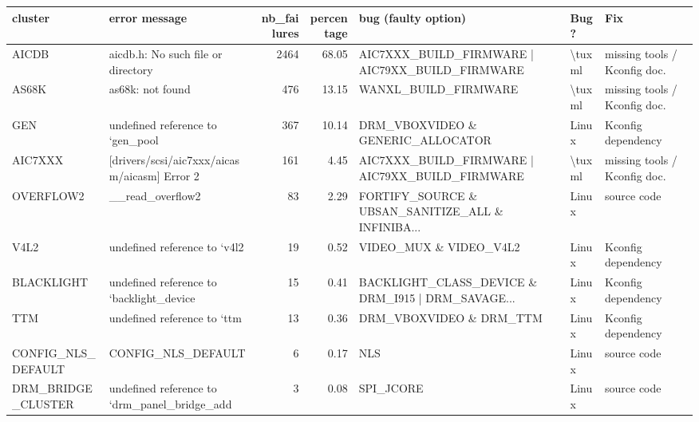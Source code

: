 \begin{tabular}{llrrlll}
\toprule
            cluster &                                      error message &  nb\_failures &  percentage &                                bug (faulty option) &    Bug? &                           Fix \\
\midrule
              AICDB &                 aicdb.h: No such file or directory &         2464 &       68.05 &    AIC7XXX\_BUILD\_FIRMWARE | AIC79XX\_BUILD\_FIRMWARE &  \textbackslash tuxml &  missing tools / Kconfig doc. \\
              AS68K &                                   as68k: not found &          476 &       13.15 &                               WANXL\_BUILD\_FIRMWARE &  \textbackslash tuxml &  missing tools / Kconfig doc. \\
                GEN &                   undefined reference to `gen\_pool &          367 &       10.14 &                  DRM\_VBOXVIDEO \& GENERIC\_ALLOCATOR &   Linux &            Kconfig dependency \\
            AIC7XXX &       [drivers/scsi/aic7xxx/aicasm/aicasm] Error 2 &          161 &        4.45 &    AIC7XXX\_BUILD\_FIRMWARE | AIC79XX\_BUILD\_FIRMWARE &  \textbackslash tuxml &  missing tools / Kconfig doc. \\
          OVERFLOW2 &                                   \_\_read\_overflow2 &           83 &        2.29 &  FORTIFY\_SOURCE \& UBSAN\_SANITIZE\_ALL \& INFINIBA... &   Linux &                   source code \\
               V4L2 &                       undefined reference to `v4l2 &           19 &        0.52 &                            VIDEO\_MUX \& VIDEO\_V4L2  &   Linux &            Kconfig dependency \\
         BLACKLIGHT &           undefined reference to `backlight\_device &           15 &        0.41 &  BACKLIGHT\_CLASS\_DEVICE \& DRM\_I915 | DRM\_SAVAGE... &   Linux &            Kconfig dependency \\
                TTM &                        undefined reference to `ttm &           13 &        0.36 &                            DRM\_VBOXVIDEO \& DRM\_TTM &   Linux &            Kconfig dependency \\
 CONFIG\_NLS\_DEFAULT &                                 CONFIG\_NLS\_DEFAULT &            6 &        0.17 &                                                NLS &   Linux &                   source code \\
 DRM\_BRIDGE\_CLUSTER &       undefined reference to `drm\_panel\_bridge\_add &            3 &        0.08 &                                          SPI\_JCORE &   Linux &                  source code  \\

\end{tabular}

